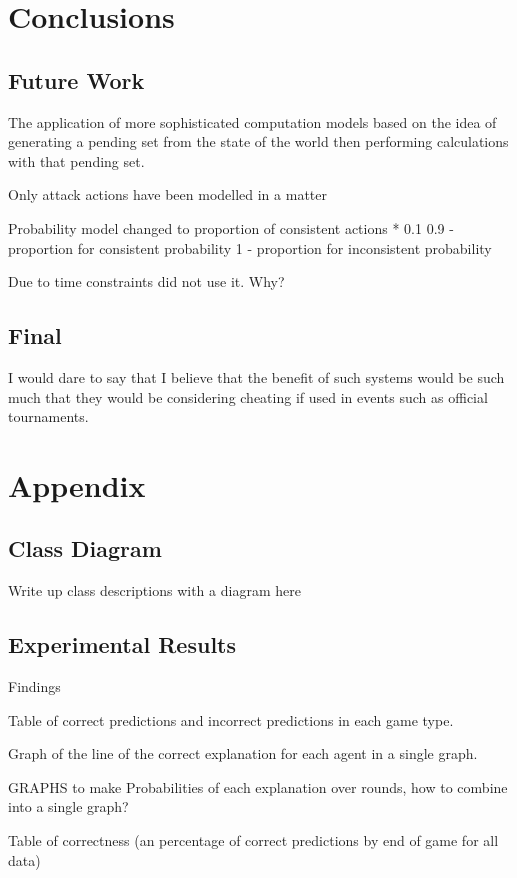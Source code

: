 \documentclass[parskip]{cs4rep}
\begin{document}
\chapter{Conclusions}

\section{Future Work}

The application of more sophisticated computation models based on the idea of generating a pending set from the state of the world then performing calculations with that pending set.

Only attack actions have been modelled in a matter 

Probability model changed to proportion of consistent actions * 0.1 
0.9 - proportion for consistent probability
1 - proportion for inconsistent probability

Due to time constraints did not use it. Why?

\section{Final}

I would dare to say that I believe that the benefit of such systems would be such much that they would be considering cheating if used in events such as official tournaments.

\chapter{Appendix}

\section{Class Diagram}

Write up class descriptions with a diagram here

\section{Experimental Results}

Findings

Table of correct predictions and incorrect predictions in each game type.

Graph of the line of the correct explanation for each agent in a single graph.

GRAPHS to make
Probabilities of each explanation over rounds, how to combine into a single graph?

Table of correctness (an percentage of correct predictions by end of game for all data)



\end{document}

